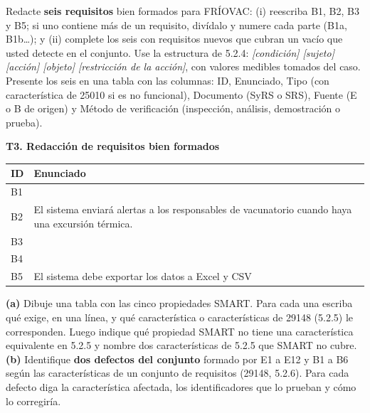 \documentclass[11pt]{article}
\begin{document}
\begin{cajatarea}[title={T3. Redacción de requisitos bien formados \hfill D3 · 30\,\%}]
	Redacte \textbf{seis requisitos} bien formados para FRÍOVAC: (i) reescriba B1, B2, B3 y B5; si uno contiene más de un requisito, divídalo y numere cada parte (B1a, B1b\ldots); y (ii) complete los seis con requisitos nuevos que cubran un vacío que usted detecte en el conjunto. Use la estructura de 5.2.4: \emph{[condición] [sujeto] [acción] [objeto] [restricción de la acción]}, con valores medibles tomados del caso.\\[4pt]
	Presente los seis en una tabla con las columnas: ID, Enunciado, Tipo (con característica de 25010 si es no funcional), Documento (SyRS o SRS), Fuente (E o B de origen) y Método de verificación (inspección, análisis, demostración o prueba).
\end{cajatarea}

\begin{cajarespuesta}[title={Respuesta del estudiante: T3}]
	\textbf{T3. Redacción de requisitos bien formados}

	\medskip
	\begin{tabular}{|l|p{13cm}|}
	\hline
	ID & Enunciado \\
	\hline
	B1 & \\
	\hline
	B2 & El sistema enviará alertas a los responsables de vacunatorio cuando haya una excursión térmica. \\
	\hline
	B3 & \\
	\hline
	B4 & \\
	\hline
	B5 & El sistema debe exportar los datos a Excel y CSV \\
	\hline
	\end{tabular}
\end{cajarespuesta}


\begin{cajatarea}[title={T4. Sustento normativo de la calidad \hfill D4 · 20\,\% (junto con las citas de T1 a T3)}]
	\textbf{(a)} Dibuje una tabla con las cinco propiedades SMART. Para cada una escriba qué exige, en una línea, y qué característica o características de 29148 (5.2.5) le corresponden. Luego indique qué propiedad SMART no tiene una característica equivalente en 5.2.5 y nombre dos características de 5.2.5 que SMART no cubre.\\[4pt]
	\textbf{(b)} Identifique \textbf{dos defectos del conjunto} formado por E1 a E12 y B1 a B6 según las características de un conjunto de requisitos (29148, 5.2.6). Para cada defecto diga la característica afectada, los identificadores que lo prueban y cómo lo corregiría.
\end{cajatarea}
\end{document}

